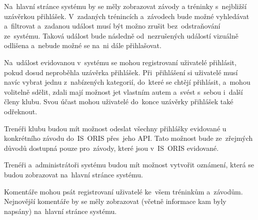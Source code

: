 \begin{enumerate}[label=\textcolor{decoration}{\textbf{F\arabic*}}, leftmargin=6mm]
	Na~hlavní stránce systému by se měly zobrazovat závody a tréninky s~nejbližší uzávěrkou přihlášek. V~zadaných trénincích a~závodech bude možné vyhledávat a~filtrovat a~zadanou událost musí být možno zrušit bez~odstraňování ze~systému. Taková událost bude následně od~nezrušených událostí vizuálně odlišena a~nebude možné se na~ni dále přihlašovat.

	Na~událost evidovanou v~systému se mohou registrovaní uživatelé přihlásit, pokud dosud neproběhla uzávěrka přihlášek. Při~přihlášení si uživatelé musí navíc vybrat jednu z~nabízených kategorií, do~které se chtějí přihlásit, a~mohou volitelně sdělit, zdali mají možnost jet vlastním autem a~svést s~sebou i~další členy klubu. Svou účast mohou uživatelé do~konce uzávěrky přihlášek také odřeknout.

	Trenéři klubu budou mít možnost odeslat všechny přihlášky evidované u konkrétního závodu do~IS~ORIS přes~jeho API. Tato možnost bude ze~zřejmých důvodů dostupná pouze pro~závody, které jsou v~IS~ORIS evidované.

	Trenéři a~administrátoři systému budou mít možnost vytvořit oznámení, která se budou zobrazovat na~hlavní stránce systému.

	Komentáře mohou psát registrovaní uživatelé ke~všem tréninkům a~závodům. Nejnovější komentáře by se měly zobrazovat (včetně informace kam byly napsány) na~hlavní stránce systému.
\end{enumerate}

